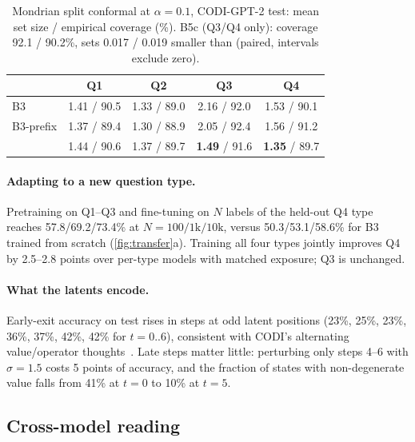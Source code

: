 \begin{table}[t]
\centering
\small
\setlength{\tabcolsep}{3pt}
\begin{tabular}{lcccc}
\toprule
& Q1 & Q2 & Q3 & Q4\\
\midrule
B3 & 1.41 / 90.5 & 1.33 / 89.0 & 2.16 / 92.0 & 1.53 / 90.1\\
B3-prefix & 1.37 / 89.4 & 1.30 / 88.9 & 2.05 / 92.4 & 1.56 / 91.2\\
\clr{} & 1.44 / 90.6 & 1.37 / 89.7 & \textbf{1.49} / 91.6 & \textbf{1.35} / 89.7\\
\bottomrule
\end{tabular}
\caption{Mondrian split conformal at $\alpha=0.1$, CODI-GPT-2 test: mean set size / empirical coverage (\%). B5c (Q3/Q4 only): coverage 92.1 / 90.2\%, sets 0.017 / 0.019 smaller than \clr{} (paired, intervals exclude zero).}
\label{tab:cp}
\end{table}

\paragraph{Adapting to a new question type.} Pretraining \clr{} on Q1--Q3 and fine-tuning on $N$ labels of the held-out Q4 type reaches 57.8/69.2/73.4\% at $N=100/1\mathrm{k}/10\mathrm{k}$, versus 50.3/53.1/58.6\% for B3 trained from scratch (\cref{fig:transfer}a). Training all four types jointly improves Q4 by 2.5--2.8 points over per-type \clr{} models with matched exposure; Q3 is unchanged.

\paragraph{What the latents encode.} Early-exit accuracy on test rises in steps at odd latent positions (23\%, 25\%, 23\%, 36\%, 37\%, 42\%, 42\% for $t=0..6$), consistent with CODI's alternating value/operator thoughts~\cite{shen2025codi}. Late steps matter little: perturbing only steps 4--6 with $\sigma=1.5$ costs 5 points of accuracy, and the fraction of states with non-degenerate value falls from 41\% at $t=0$ to 10\% at $t=5$.

\subsection{Cross-model reading}
\label{sec:exp-cross}

